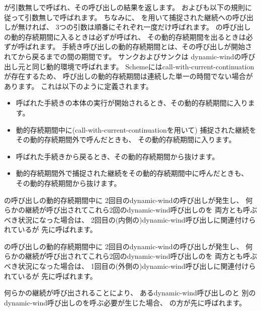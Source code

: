 \begin{entry}{%
}

が引数無しで呼ばれ、その呼び出しの結果を返します。
およびも以下の規則に従って引数無しで呼ばれます。
ちなみに、
を用いて捕捉された継続への呼び出しが無ければ、
3つの引数は順番にそれぞれ一度だけ呼ばれます。
の呼び出しの動的存続期間に入るときは必ずが呼ばれ、
その動的存続期間を出るときは必ずが呼ばれます。
手続き呼び出しの動的存続期間とは、その呼び出しが開始されてから戻るまでの間の期間です。
サンクおよびサンクは
{\cf dynamic-wind}の呼び出し元と同じ動的環境で呼ばれます。
Schemeには{\cf call-with-current-continuation}が存在するため、
呼び出しの動的存続期間は連続した単一の時間でない場合があります。
これは以下のように定義されます。
\begin{itemize}
\item 呼ばれた手続きの本体の実行が開始されるとき、その動的存続期間に入ります。

\item 動的存続期間中に({\cf call-with-current-continuation}を用いて)
捕捉された継続をその動的存続期間外で呼んだときも、
その動的存続期間に入ります。

\item 呼ばれた手続きから戻るとき、その動的存続期間から抜けます。

\item 動的存続期間外で捕捉された継続をその動的存続期間中に呼んだときも、
その動的存続期間から抜けます。
\end{itemize}

の呼び出しの動的存続期間中に
2回目の{\cf dynamic-wind}の呼び出しが発生し、
何らかの継続が呼び出されてこれら2回の{\cf dynamic-wind}呼び出しのを
両方とも呼ぶべき状況になった場合は、
2回目の(内側の){\cf dynamic-wind}呼び出しに関連付けられているが
先に呼ばれます。

の呼び出しの動的存続期間中に
2回目の{\cf dynamic-wind}の呼び出しが発生し、
何らかの継続が呼び出されてこれら2回の{\cf dynamic-wind}呼び出しのを
両方とも呼ぶべき状況になった場合は、
1回目の(外側の){\cf dynamic-wind}呼び出しに関連付けられているが
先に呼ばれます。

何らかの継続が呼び出されることにより、
ある{\cf dynamic-wind}呼び出しのと
別の{\cf dynamic-wind}呼び出しのを呼ぶ必要が生じた場合、
の方が先に呼ばれます。


\end{entry}
